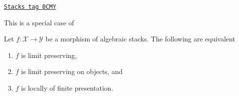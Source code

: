 \begin{proposition}
\label{stacks-limits-proposition-characterize-locally-finite-presentation}
\href{https://stacks.math.columbia.edu/tag/0CMY}{\texttt{Stacks tag 0CMY}}

\begin{reference}
This is a special case of \cite[Lemma 2.3.15]{Emerton-Gee}
\end{reference}
Let $f : \mathcal{X} \to \mathcal{Y}$ be a morphism of algebraic stacks.
The following are equivalent
\begin{enumerate}
\item $f$ is limit preserving,
\item $f$ is limit preserving on objects, and
\item $f$ is locally of finite presentation.
\end{enumerate}
\end{proposition}

